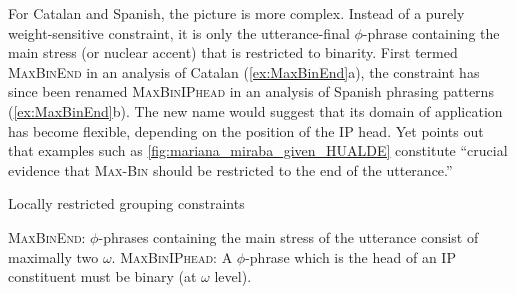 


For Catalan and Spanish, the picture is more complex. Instead of a purely 
weight-sensitive constraint, it is only the utterance-final $\phi$-phrase 
containing the main stress (or nuclear accent) that is restricted to 
binarity. First termed \textsc{MaxBinEnd} in an analysis of Catalan 
(\ref{ex:MaxBinEnd}a), the constraint has since been renamed 
\textsc{MaxBinIPhead} in an analysis of Spanish phrasing patterns 
(\ref{ex:MaxBinEnd}b). The new name would suggest that its domain of 
application has become flexible, depending on the position of the IP head. 
Yet \citet[52]{Prieto.2006} points out that examples such as \autoref{fig:mariana_miraba_given_HUALDE} constitute ``crucial evidence 
that \textsc{Max-Bin} should be restricted to the end of the utterance.''

\begin{exe}
\ex\label{ex:MaxBinEnd}Locally restricted grouping constraints
	\begin{xlist}
		\ex \textsc{MaxBinEnd}: $\phi$-phrases containing the main stress 
		of the utterance consist of maximally two $\omega$. \citep[205]{Prieto.2005}
		\ex \textsc{MaxBinIPhead}: A $\phi$-phrase which is the head of an 
		\ac{IP} constituent must be binary (at $\omega$ level). \citep[52]{Prieto.2006}
	\end{xlist}
\end{exe}

